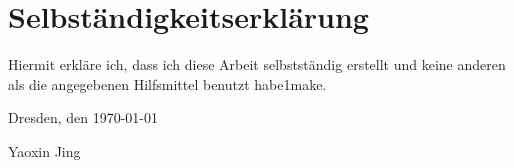  

\section*{\vfill{} \thispagestyle{empty}
Selbständigkeitserklärung}

Hiermit erkläre ich, dass ich diese Arbeit selbstständig erstellt
und keine anderen als die angegebenen Hilfsmittel benutzt habe1make.
\bigskip{}

\noindent Dresden, den \today %
\vspace{2.5cm}

\noindent Yaoxin Jing {}
